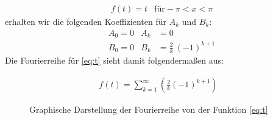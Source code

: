 \newpage
    \begin{align}
        &f(t) = t &\text{für} -\pi < x < \pi \label{eq:t}
    \end{align}
    erhalten wir die folgenden Koeffizienten für $A_k$ und $B_k$:
    \begin{align*}
        &A_0 = 0 &A_k &= 0\\
        &B_0 = 0 &B_k &= \frac{2}{k}\:(-1)^{k+1}
    \end{align*}
    Die Fourierreihe für \eqref{eq:t} sieht damit folgendermaßen aus:

    \begin{align}
        f(t)= \sum_{k=1}^{\infty} \left(\frac{2}{k} (-1)^{k+1}\right)
    \end{align}
    \begin{figure}[h]   %
        \centering
        \caption{Graphische Darstellung der Fourierreihe von der Funktion \eqref{eq:t}} \vspace{-1.5em}
        \label{fig:sc_t}
    \end{figure}

